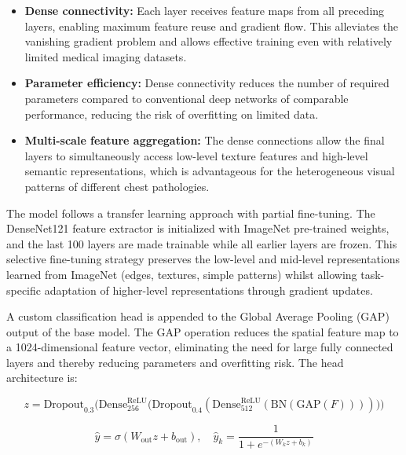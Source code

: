\begin{itemize}
	\item \textbf{Dense connectivity:} Each layer receives feature maps from all preceding layers, enabling maximum feature reuse and gradient flow. This alleviates the vanishing gradient problem and allows effective training even with relatively limited medical imaging datasets.
	
	\item \textbf{Parameter efficiency:} Dense connectivity reduces the number of required parameters compared to conventional deep networks of comparable performance, reducing the risk of overfitting on limited data.
	
	\item \textbf{Multi-scale feature aggregation:} The dense connections allow the final layers to simultaneously access low-level texture features and high-level semantic representations, which is advantageous for the heterogeneous visual patterns of different chest pathologies.
\end{itemize}

The model follows a transfer learning approach with partial fine-tuning. The DenseNet121 feature extractor is initialized with ImageNet pre-trained weights, and the last 100 layers are made trainable while all earlier layers are frozen. This selective fine-tuning strategy preserves the low-level and mid-level representations learned from ImageNet (edges, textures, simple patterns) whilst allowing task-specific adaptation of higher-level representations through gradient updates.

A custom classification head is appended to the Global Average Pooling (GAP) output of the base model. The GAP operation reduces the spatial feature map to a 1024-dimensional feature vector, eliminating the need for large fully connected layers and thereby reducing parameters and overfitting risk. The head architecture is:

\begin{equation}
	z =
	\mathrm{Dropout}_{0.3}
	\Big(
	\mathrm{Dense}_{256}^{\mathrm{ReLU}}
	\big(
	\mathrm{Dropout}_{0.4}
	(\mathrm{Dense}_{512}^{\mathrm{ReLU}}(\mathrm{BN}(\mathrm{GAP}(F))))
	\big)
	\Big)
	\label{eq:classification_head}
\end{equation}

\begin{equation}
	\hat{y} = \sigma(W_{\mathrm{out}} z + b_{\mathrm{out}}),
	\quad
	\hat{y}_k = \frac{1}{1 + e^{-(W_k z + b_k)}}
	\label{eq:ovr_output}
\end{equation}

